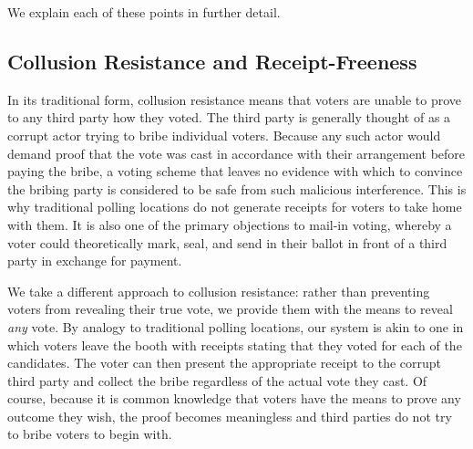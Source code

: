 \documentclass{article}
\begin{document}
We explain each of these points in further detail.
\subsection{Collusion Resistance and Receipt-Freeness }
In its traditional form, collusion resistance means that voters are unable to prove to any third party how they voted.  The third party is generally thought of as a corrupt actor trying to bribe individual voters.  Because any such actor would demand proof that the vote was cast in accordance with their arrangement before paying the bribe, a voting scheme that leaves no evidence with which to convince the bribing party is considered to be safe from such malicious interference.  This is why traditional polling locations do not generate receipts for voters to take home with them.  It is also one of the primary objections to mail-in voting, whereby a voter could theoretically mark, seal, and send in their ballot in front of a third party in exchange for payment.

We take a different approach to collusion resistance: rather than preventing voters from revealing their true vote, we provide them with the means to reveal \emph{any} vote.  By analogy to traditional polling locations, our system is akin to one in which voters leave the booth with receipts stating that they voted for each of the candidates.  The voter can then present the appropriate receipt to the corrupt third party and collect the bribe regardless of the actual vote they cast.  Of course, because it is common knowledge that voters have the means to prove any outcome they wish, the proof becomes meaningless and third parties do not try to bribe voters to begin with.  
\end{document}
